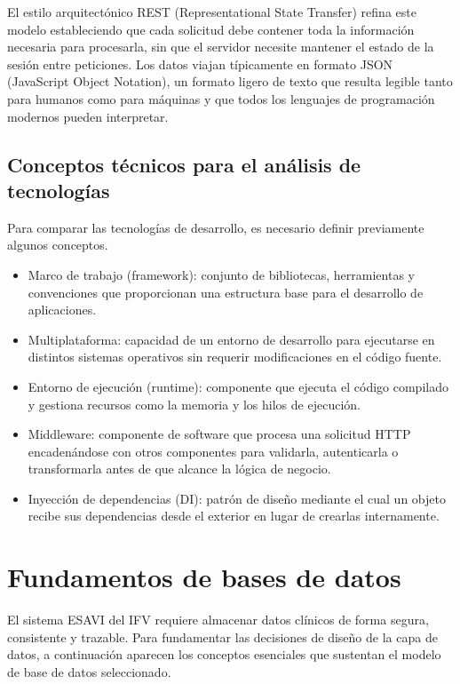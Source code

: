 El estilo arquitectónico REST (Representational State Transfer) refina este modelo estableciendo que cada solicitud debe contener toda la información necesaria para procesarla, sin que el servidor necesite mantener el estado de la sesión entre peticiones. 
Los datos viajan típicamente en formato JSON (JavaScript Object Notation), un formato ligero de texto que resulta legible tanto para humanos como para máquinas y que todos los lenguajes de programación modernos pueden interpretar.

\subsection{Conceptos técnicos para el análisis de tecnologías}

Para comparar las tecnologías de desarrollo, es necesario definir previamente algunos conceptos.

\begin{itemize}
	\item Marco de trabajo (framework): conjunto de bibliotecas, herramientas y convenciones que proporcionan una estructura base para el desarrollo de aplicaciones.
	\item Multiplataforma: capacidad de un entorno de desarrollo para ejecutarse en distintos sistemas operativos sin requerir modificaciones en el código fuente.
	\item Entorno de ejecución (runtime): componente que ejecuta el código compilado y gestiona recursos como la memoria y los hilos de ejecución.
	\item Middleware: componente de software que procesa una solicitud HTTP encadenándose con otros componentes para validarla, autenticarla o transformarla antes de que alcance la lógica de negocio.
	\item Inyección de dependencias (DI): patrón de diseño mediante el cual un objeto recibe sus dependencias desde el exterior en lugar de crearlas internamente.
\end{itemize}

\section{Fundamentos de bases de datos}

El sistema ESAVI del IFV requiere almacenar datos clínicos de forma segura, consistente y trazable. 
Para fundamentar las decisiones de diseño de la capa de datos, a continuación aparecen los conceptos esenciales que sustentan el modelo de base de datos seleccionado.

